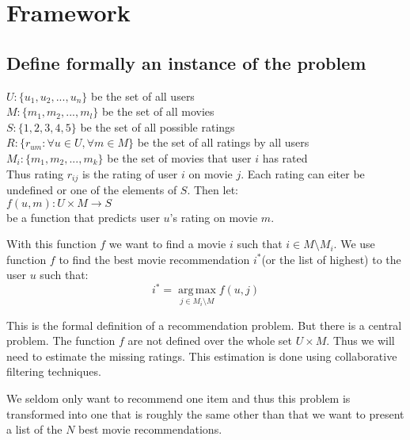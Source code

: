 \documentclass[a4paper,11pt]{article}
\begin{document}
\section{Framework}
\subsection{Define formally an instance of the problem}
$U : \{u_1, u_2, ..., u_n\}$ be the set of all users\\
$M : \{m_1, m_2, ..., m_l\}$ be the set of all movies\\
$S : \{1,2,3,4,5\}$ be the set of all possible ratings \\
$R : \{r_{um} : \forall u \in U, \forall m \in M\}$ be the set of all ratings by all users\\
$M_i : \{m_1, m_2, ..., m_k\}$ be the set of movies that user $i$ has rated \\

Thus rating $r_{ij}$ is the rating of user $i$ on movie $j$. Each rating can eiter be undefined
or one of the elements of $S$. Then let: \\

$f(u,m) : U \times M \to S$ \\

be a function that predicts user $u$'s rating on movie $m$.

With this function $f$ we want to find a movie $i$ such that $i \in M \setminus M_i$.
We use function $f$ to find the best movie recommendation $i^{*}$(or the list of highest) to
the user $u$ such that: \\
\[ i^{*} = \operatorname*{arg\,max}_{j \in M_i \setminus M} f(u,j) \]

This is the formal definition of a recommendation problem. But there is a central problem. The
function $f$ are not defined over the whole set $U \times M$. Thus we will need to estimate
the missing ratings. This estimation is done using collaborative filtering techniques.

We seldom only want to recommend one item and thus this problem is transformed into one that
is roughly the same other than that we want to present a list of the $N$ best movie recommendations.
\end{document}
